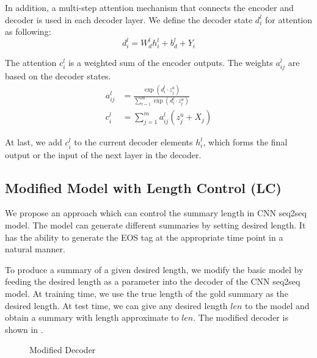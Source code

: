In addition, a multi-step attention mechanism that connects the encoder and
decoder is used in each decoder layer. 
We define the decoder state $d^l_{i}$ for attention as following:
\begin{equation}
d^l_{i}\!=\!W^l_{d}h^l_{i}\!+\!b^l_{d}+Y_{i}
\end{equation}

The attention $c^l_{i}$ is a weighted sum of the encoder outputs.
The weights $a^l_{ij}$ are based on the decoder states.
\begin{align}
a^l_{ij} \!&=\! \frac {\exp(d^l_{i}\cdot z^u_{j})}{\sum^m_{t=1} \exp(d^l_{i}\cdot z^u_{t})} \\
c^l_{i}  \!&=\! \sum^m_{j=1} a^l_{ij}(z^u_{j}+X_{j})
\end{align}

At last, we add $c^l_{i}$ to the current decoder elements $h^l_{i}$,
which forms the final output or the
input of the next layer in the decoder.

\subsection{Modified Model with Length Control (LC)}
\label{sec:lc}
We propose an approach which can control the summary length
in CNN seq2seq model.  The model can generate different summaries by
setting desired length. It has the ability to generate the EOS tag at the appropriate time
point in a natural manner. 


To produce a summary of a given desired length,
we modify the basic model by feeding the desired length as
a parameter into the decoder of the CNN seq2seq model.
At training time, we use the true length of the gold summary as the
desired length. At test time, we can give any desired length $len$
to the model and obtain
a summary with length approximate to $len$.
The modified decoder is shown in .

\begin{figure}[th]
\centering
{}
\caption{Modified Decoder}
\label{fig:model}
\end{figure}


